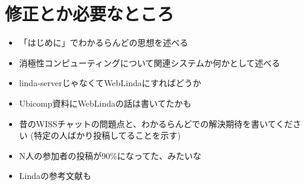 \section*{修正とか必要なところ}

\begin{itemize}
  \item 「はじめに」でわかるらんどの思想を述べる
  \item 消極性コンピューティング\cite{kurihara2016}について関連システムか何かとして述べる
  \item linda-serverじゃなくてWebLindaにすればどうか
  \item Ubicomp資料\cite{shokai_furnitue}にWebLindaの話は書いてたかも
  \item 昔のWISSチャットの問題点と、わかるらんどでの解決期待を書いてください
    (特定の人ばかり投稿してることを示す)
  \item N人の参加者の投稿が90\%になってた、みたいな
  \item Lindaの参考文献も\cite{Carriero:1989:LC:63334.63337}
\end{itemize}
